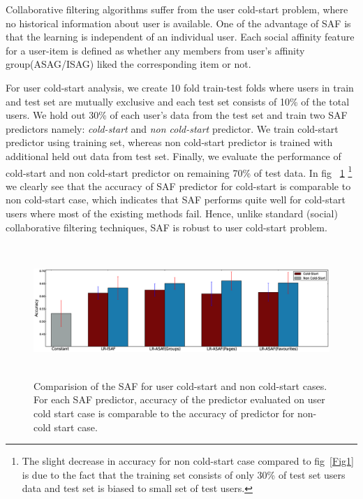 Collaborative filtering algorithms suffer from the user cold-start problem,
where no historical information about user is available. One of the advantage of SAF is that 
the learning is independent of an individual user. Each social affinity feature for a user-item is
defined as whether any members from user's affinity group(ASAG/ISAG) liked the corresponding item or not. 

For user cold-start analysis, we create 10 fold train-test folds where users in train and test set are mutually exclusive
and each test set consists of 10\% of the total users. We hold out 30\% of each user's data from the test set 
and train two SAF predictors namely: \textit{cold-start} and \textit{non cold-start} predictor.
We train cold-start predictor using training set, whereas non cold-start predictor is trained with additional 
held out data from test set. Finally, we evaluate the performance of cold-start and non cold-start predictor on remaining 70\% 
of test data. In fig ~\ref{fig:coldstart} \footnote{ The slight decrease in accuracy for non cold-start case compared to 
fig~\ref{Fig1} is due to the fact that the training set consists of only 30\% of test set users data and test 
set is biased to small set of test users.} we clearly see that the accuracy of  SAF predictor for cold-start is comparable
to non cold-start case, which indicates that SAF performs quite well for cold-start users where most of the
existing methods fail. Hence, unlike standard (social) collaborative filtering techniques, SAF is robust to user 
cold-start problem.  


\begin{figure}[tbp!]
\centering
\includegraphics[width=180mm,height=50mm]{data/plots/new/cold_start.eps}
\vspace{-3mm}
\caption{Comparision of the SAF for user cold-start and non cold-start cases.
For each SAF predictor, accuracy of the predictor evaluated on user
cold start case is comparable to the accuracy of predictor for non-cold start case.}
\label{fig:coldstart}
\end{figure}
 
